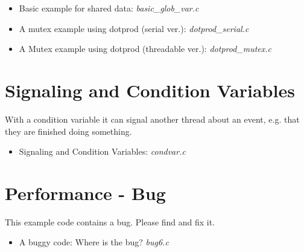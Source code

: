 \documentclass{article} \usepackage{listings}
\begin{document}
\begin{itemize}

\item Basic example for shared data: {\it basic\_glob\_var.c}


\item A mutex example using dotprod (serial ver.): {\it dotprod\_serial.c}


\item A Mutex example using dotprod (threadable ver.): {\it dotprod\_mutex.c}


\end{itemize}


\section{Signaling and Condition Variables}
With a condition variable it can signal another thread about an event, e.g. that they are finished doing something.

\begin{itemize}

\item Signaling and Condition Variables: {\it condvar.c}


%


\end{itemize}

\section{Performance - Bug}

This example code contains a bug. Please find and fix it.

\begin{itemize}
\item A buggy code: Where is the bug? {\it bug6.c}



\end{itemize}
\end{document}

